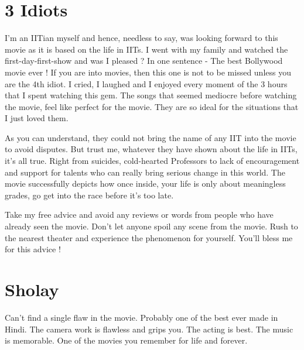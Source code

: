 \documentclass{article}
\begin{document}
\section{3 Idiots}
	
I'm an IITian myself and hence, needless to say, was looking forward to this movie as it is based on the life in IITs. I went with my family and watched the first-day-first-show and was I pleased ? In one sentence - The best Bollywood movie ever ! If you are into movies, then this one is not to be missed unless you are the 4th idiot. I cried, I laughed and I enjoyed every moment of the 3 hours that I spent watching this gem. The songs that seemed mediocre before watching the movie, feel like perfect for the movie. They are so ideal for the situations that I just loved them.

As you can understand, they could not bring the name of any IIT into the movie to avoid disputes. But trust me, whatever they have shown about the life in IITs, it's all true. Right from suicides, cold-hearted Professors to lack of encouragement and support for talents who can really bring serious change in this world. The movie successfully depicts how once inside, your life is only about meaningless grades, go get into the race before it's too late.

Take my free advice and avoid any reviews or words from people who have already seen the movie. Don't let anyone spoil any scene from the movie. Rush to the nearest theater and experience the phenomenon for yourself. You'll bless me for this advice !

\section{Sholay}
	

Can't find a single flaw in the movie. Probably one of the best ever made in Hindi. The camera work is flawless and grips you. The acting is best. The music is memorable. One of the movies you remember for life and forever.
\end{document}
